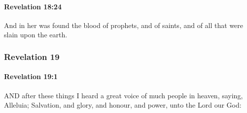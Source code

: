 		\paragraph{Revelation 18:24} %
			\label{REVELATIONNT-18-24}

			And in her was found the blood of prophets, and of saints, and of all that were slain upon the earth.

			\begin{framed}
			\scriptsize
				\begin{compactdesc}
					\item[SBLG] 
				\end{compactdesc}
			\end{framed}

	\subsubsection{Revelation 19} %
		\label{REVELATIONNT-19}
		
		\paragraph{Revelation 19:1} %
			\label{REVELATIONNT-19-1}

			AND after these things I heard a great voice of much people in heaven, saying, Alleluia; Salvation, and glory, and honour, and power, unto the Lord our God:

